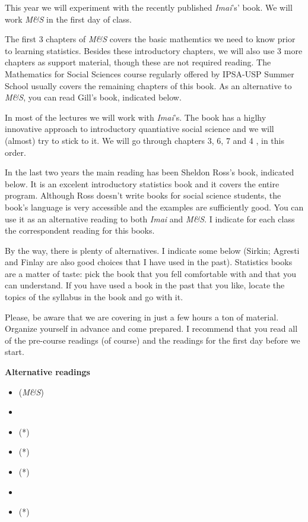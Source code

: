 \documentclass[a4paper,11pt]{article}
\begin{document}
This year we will experiment with the recently published \emph{Imai}'s' book. We will work \emph{M\&S} in the first day of class.

The first 3 chapters of \emph{M\&S} covers the basic mathemtics we need to know prior to learning statistics. Besides these introductory chapters, we will also use 3 more chapters as support material, though these are not required reading. The Mathematics for Social Sciences course regularly offered by IPSA-USP Summer School usually covers the remaining chapters of this book. As an alternative to \emph{M\&S}, you can read Gill's book, indicated below.

In most of the lectures we will work with \emph{Imai}'s. The book has a higlhy innovative approach to introductory quantiative social science and we will (almost) try to stick to it. We will go through chapters 3, 6, 7 and 4 , in this order.

In the last two years the main reading has been Sheldon Ross's book, indicated below. It is an excelent introductory statistics book and it covers the entire program. Although Ross doesn't write books for social science students, the book's language is very accessible and the examples are sufficiently  good. You can use it as an alternative reading to both \emph{Imai} and \emph{M\&S}. I indicate for each class the correspondent reading for this books.

By the way, there is plenty of alternatives. I indicate some below (Sirkin; Agresti and Finlay are also good choices that I have used in the past). Statistics books are a matter of taste: pick the book that you fell comfortable with and that you can understand. If you have used a book in the past that you like, locate the topics of the syllabus in the book and go with it.

Please, be aware that we are covering in just a few hours a ton of material. Organize yourself in advance and come prepared. I recommend that you read all of the pre-course readings (of course) and the readings for the first day before we start.

\textbf{Alternative readings}

\begin{itemize}
  \item (\emph{M\&S}) 
  \item {}
  \item {} (*)
  \item {} (*)
  \item {} (*)
  \item {}
  \item {} (*)
\end{itemize}
\end{document}
